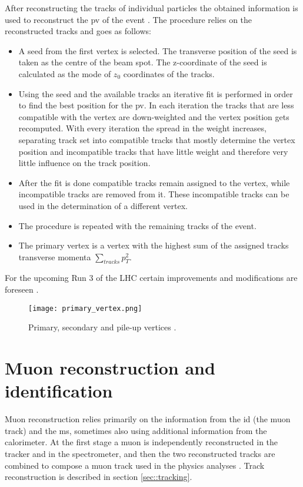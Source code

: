   After reconstructing the tracks of individual particles the obtained information is used to reconstruct the \gls{pv} of the event \cite{PrimVertRun12}. The procedure relies on the reconstructed tracks and goes as follows:
  \begin{itemize}
  \item A seed from the first vertex is selected. The transverse position of the seed is taken as the centre of the beam spot. The z-coordinate of the seed is calculated as the mode of $z_0$ coordinates of the tracks.
  \item Using the seed and the available tracks an iterative fit is performed in order to find the best position for the \gls{pv}. In each iteration the tracks that are less compatible with the vertex are down-weighted and the vertex position gets recomputed. With every iteration the spread in the weight increases, separating track set into compatible tracks that mostly determine the vertex position and incompatible tracks that have little weight and therefore very little influence on the track position. 
  \item After the fit is done compatible tracks remain assigned to the vertex, while incompatible tracks are removed from it. These incompatible tracks can be used in the determination of a different vertex.
  \item The procedure is repeated with the remaining tracks of the event. 
  \item The primary vertex is a vertex with the highest sum of the assigned tracks transverse momenta $\sum_{tracks}p_T^{2}$.
  \end{itemize}  
  For the upcoming Run 3 of the LHC certain improvements and modifications are foreseen \cite{PrimVertRun3}.
  \begin{figure}[htbp]
  	\centering
  	\texttt{[image: primary\_vertex.png]}
  	\caption[Types of vertices]{Primary, secondary and pile-up vertices \cite{vert_recon}.}
  	\label{fig::pv}
  \end{figure}
    \section{Muon reconstruction and identification}
    Muon reconstruction relies primarily on the information from the \gls{id} (the muon track) and the \gls{ms}, sometimes also using additional information from the calorimeter. At the first stage a muon is independently reconstructed in the tracker and in the spectrometer, and then the two reconstructed tracks are combined to compose a muon track used in the physics analyses \cite{muons_reco1}. Track reconstruction is described in section \ref{sec::tracking}. 
